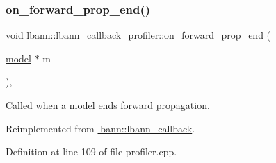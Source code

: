 \subsubsection{\texorpdfstring{on\+\_\+forward\+\_\+prop\+\_\+end()}{on\_forward\_prop\_end()}\hspace{0.1cm}{\footnotesize\ttfamily [1/2]}}
{\footnotesize\ttfamily void lbann\+::lbann\+\_\+callback\+\_\+profiler\+::on\+\_\+forward\+\_\+prop\+\_\+end (\begin{DoxyParamCaption}\item[{\hyperlink{classlbann_1_1model}{model} $\ast$}]{m }\end{DoxyParamCaption})\hspace{0.3cm}{\ttfamily [override]}, {\ttfamily [virtual]}}

Called when a model ends forward propagation. 

Reimplemented from \hyperlink{classlbann_1_1lbann__callback_a79a0bb407852d7b330b74373647ffe46}{lbann\+::lbann\+\_\+callback}.



Definition at line 109 of file profiler.\+cpp.


